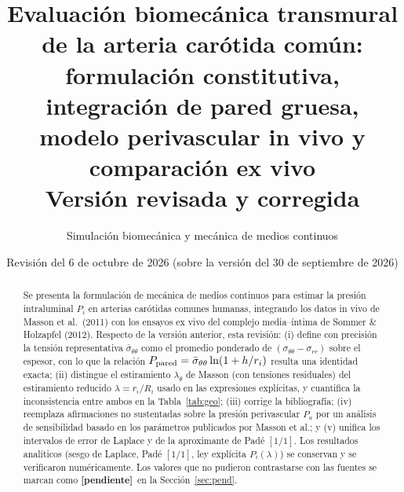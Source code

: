 \documentclass[11pt]{article}
\title{\textbf{Evaluación biomecánica transmural de la arteria carótida común:\\ formulación constitutiva, integración de pared gruesa,\\ modelo perivascular in vivo y comparación ex vivo}\\[4pt]\large Versión revisada y corregida}
\author{Simulación biomecánica y mecánica de medios continuos}
\date{Revisión del 6 de octubre de 2026 (sobre la versión del 30 de septiembre de 2026)}
\newcommand{\sbar}{\bar\sigma_{\theta\theta}}
\newcommand{\pend}{\textcolor{red!70!black}{\textbf{[pendiente]}}}
\begin{document}
\maketitle
\begin{abstract}
Se presenta la formulación de mecánica de medios continuos para estimar la presión intraluminal $P_i$ en arterias carótidas comunes humanas, integrando los datos in vivo de Masson et al.\ (2011) con los ensayos ex vivo del complejo media--íntima de Sommer \& Holzapfel (2012). Respecto de la versión anterior, esta revisión: (i) define con precisión la tensión representativa $\sbar$ como el promedio ponderado de $(\sigma_{\theta\theta}-\sigma_{rr})$ sobre el espesor, con lo que la relación $P_{\rm pared}=\sbar\ln(1+h/r_i)$ resulta una identidad exacta; (ii) distingue el estiramiento $\lambda_\theta$ de Masson (con tensiones residuales) del estiramiento reducido $\lambda=r_i/R_i$ usado en las expresiones explícitas, y cuantifica la inconsistencia entre ambos en la Tabla~\ref{tab:geo}; (iii) corrige la bibliografía; (iv) reemplaza afirmaciones no sustentadas sobre la presión perivascular $P_a$ por un análisis de sensibilidad basado en los parámetros publicados por Masson et al.; y (v) unifica los intervalos de error de Laplace y de la aproximante de Padé $[1/1]$. Los resultados analíticos (sesgo de Laplace, Padé $[1/1]$, ley explícita $P_i(\lambda)$) se conservan y se verificaron numéricamente. Los valores que no pudieron contrastarse con las fuentes se marcan como \pend\ en la Sección~\ref{sec:pend}.
\end{abstract}
\tableofcontents

\end{document}

